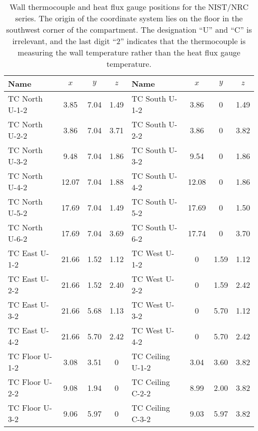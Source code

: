 \begin{table}[ht]
\caption[Wall measurement positions for the NIST/NRC series]
{Wall thermocouple and heat flux gauge positions for the NIST/NRC series. The origin of the coordinate system lies on the floor in the southwest
corner of the compartment. The designation ``U'' and ``C'' is irrelevant, and the last digit ``2'' indicates that the thermocouple is measuring the wall temperature rather than the heat flux gauge temperature.}
\begin{center}
\begin{tabular}{|l|c|c|c||l|c|c|c|}
\hline
Name              & $x$   & $y$  & $z$      & Name              & $x$   & $y$   & $z$       \\ \hline \hline
TC North U-1-2    & 3.85  & 7.04 & 1.49     & TC South U-1-2    & 3.86  & 0     & 1.49      \\ \hline
TC North U-2-2    & 3.86  & 7.04 & 3.71     & TC South U-2-2    & 3.86  & 0     & 3.82      \\ \hline
TC North U-3-2    & 9.48  & 7.04 & 1.86     & TC South U-3-2    & 9.54  & 0     & 1.86      \\ \hline
TC North U-4-2    & 12.07 & 7.04 & 1.88     & TC South U-4-2    & 12.08 & 0     & 1.86      \\ \hline
TC North U-5-2    & 17.69 & 7.04 & 1.49     & TC South U-5-2    & 17.69 & 0     & 1.50      \\ \hline
TC North U-6-2    & 17.69 & 7.04 & 3.69     & TC South U-6-2    & 17.74 & 0     & 3.70      \\ \hline \hline
TC East U-1-2     & 21.66 & 1.52 & 1.12     & TC West U-1-2     & 0     & 1.59  & 1.12      \\ \hline
TC East U-2-2     & 21.66 & 1.52 & 2.40     & TC West U-2-2     & 0     & 1.59  & 2.42      \\ \hline
TC East U-3-2     & 21.66 & 5.68 & 1.13     & TC West U-3-2     & 0     & 5.70  & 1.12      \\ \hline
TC East U-4-2     & 21.66 & 5.70 & 2.42     & TC West U-4-2     & 0     & 5.70  & 2.42      \\ \hline \hline
TC Floor U-1-2    & 3.08  & 3.51 & 0        & TC Ceiling U-1-2  & 3.04  & 3.60  & 3.82      \\ \hline
TC Floor U-2-2    & 9.08  & 1.94 & 0        & TC Ceiling C-2-2  & 8.99  & 2.00  & 3.82      \\ \hline
TC Floor U-3-2    & 9.06  & 5.97 & 0        & TC Ceiling C-3-2  & 9.03  & 5.97  & 3.82      \\ \hline

\end{tabular}
\end{center}
\end{table}
